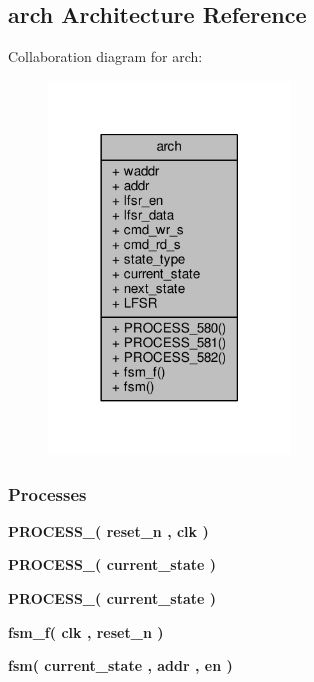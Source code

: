 \subsection{arch Architecture Reference}
\label{classddr2__cmd__fifo__tst_1_1arch}


Collaboration diagram for arch\+:\nopagebreak
\begin{figure}[H]
\begin{center}
\leavevmode
\includegraphics[width=182pt]{d1/d59/classddr2__cmd__fifo__tst_1_1arch__coll__graph}
\end{center}
\end{figure}
\subsubsection*{Processes}
 \begin{DoxyCompactItemize}
\item 
{\bf P\+R\+O\+C\+E\+S\+S\+\_}{\bfseries  ( {\bfseries {\bfseries {\bf reset\+\_\+n}} \textcolor{vhdlchar}{ }} , {\bfseries {\bfseries {\bf clk}} \textcolor{vhdlchar}{ }} )}
\item 
{\bf P\+R\+O\+C\+E\+S\+S\+\_}{\bfseries  ( {\bfseries {\bfseries {\bf current\+\_\+state}} \textcolor{vhdlchar}{ }} )}
\item 
{\bf P\+R\+O\+C\+E\+S\+S\+\_}{\bfseries  ( {\bfseries {\bfseries {\bf current\+\_\+state}} \textcolor{vhdlchar}{ }} )}
\item 
{\bf fsm\+\_\+f}{\bfseries  ( {\bfseries {\bfseries {\bf clk}} \textcolor{vhdlchar}{ }} , {\bfseries {\bfseries {\bf reset\+\_\+n}} \textcolor{vhdlchar}{ }} )}
\item 
{\bf fsm}{\bfseries  ( {\bfseries {\bfseries {\bf current\+\_\+state}} \textcolor{vhdlchar}{ }} , {\bfseries {\bfseries {\bf addr}} \textcolor{vhdlchar}{ }} , {\bfseries {\bfseries {\bf en}} \textcolor{vhdlchar}{ }} )}
\end{DoxyCompactItemize}
